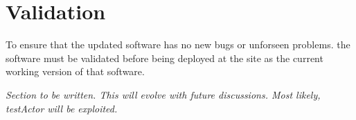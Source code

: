 \section{Validation}
\label{sect:validation}

To ensure that the updated software has no new bugs or unforseen problems.
the software must be validated before being deployed at the site as
the current working version of that software.

{\it Section to be written. This will evolve with future discussions.
Most likely, testActor will be exploited.
}
